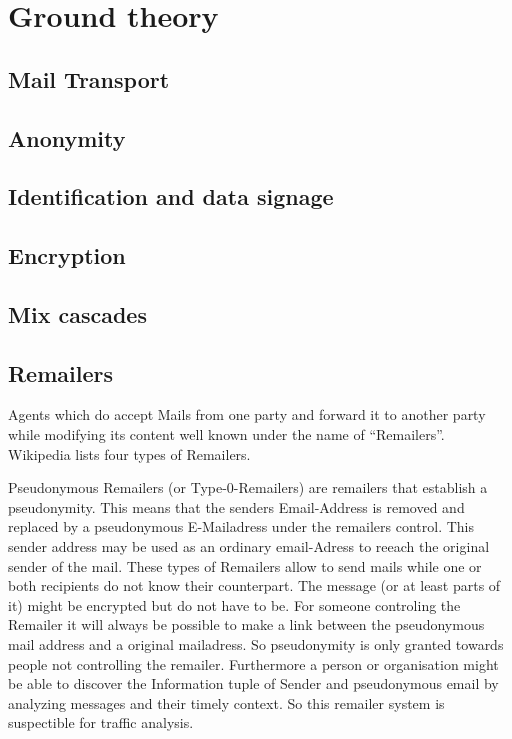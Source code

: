 \chapter{Ground theory}
\section{Mail Transport}
\section{Anonymity}
\section{Identification and data signage}
\section{Encryption}
\section{Mix cascades}
\section{Remailers}
Agents which do accept Mails from one party and forward it to another party while modifying its content well known under the name of ``Remailers''. Wikipedia \cite{wiki:remailer} lists four types of Remailers.\par

Pseudonymous Remailers (or Type-0-Remailers) are remailers that establish a pseudonymity. This means that the senders Email-Address is removed and replaced by a pseudonymous E-Mailadress under the remailers control. This sender address may be used as an ordinary email-Adress to reeach the original sender of the mail. These types of Remailers allow to send mails while one or both recipients do not know their counterpart. The message (or at least parts of it) might be encrypted but do not have to be. For someone controling the Remailer it will always be possible to make a link between the pseudonymous mail address and a original mailadress. So pseudonymity is only granted towards people not controlling the remailer. Furthermore a person or organisation might be able to discover the Information tuple of Sender and pseudonymous email by analyzing messages and their timely context. So this remailer system is suspectible for traffic analysis.\par

